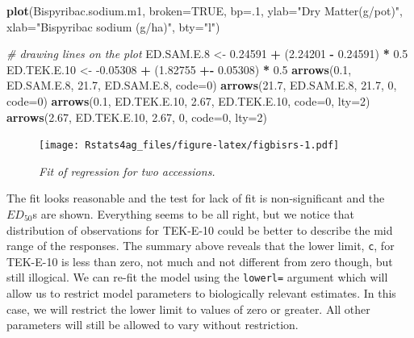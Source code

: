 \documentclass[letterpaper,]{book}
\newenvironment{Shaded}{\begin{snugshade}}{\end{snugshade}}
\newcommand{\CommentTok}[1]{\textcolor[rgb]{0.56,0.35,0.01}{\textit{#1}}}
\newcommand{\DataTypeTok}[1]{\textcolor[rgb]{0.13,0.29,0.53}{#1}}
\newcommand{\DecValTok}[1]{\textcolor[rgb]{0.00,0.00,0.81}{#1}}
\newcommand{\FloatTok}[1]{\textcolor[rgb]{0.00,0.00,0.81}{#1}}
\newcommand{\KeywordTok}[1]{\textcolor[rgb]{0.13,0.29,0.53}{\textbf{#1}}}
\newcommand{\NormalTok}[1]{#1}
\newcommand{\OperatorTok}[1]{\textcolor[rgb]{0.81,0.36,0.00}{\textbf{#1}}}
\newcommand{\OtherTok}[1]{\textcolor[rgb]{0.56,0.35,0.01}{#1}}
\newcommand{\StringTok}[1]{\textcolor[rgb]{0.31,0.60,0.02}{#1}}
\begin{document}
\begin{Shaded}
\begin{Highlighting}[]
\KeywordTok{plot}\NormalTok{(Bispyribac.sodium.m1, }\DataTypeTok{broken=}\OtherTok{TRUE}\NormalTok{, }\DataTypeTok{bp=}\NormalTok{.}\DecValTok{1}\NormalTok{, }\DataTypeTok{ylab=}\StringTok{"Dry Matter(g/pot)"}\NormalTok{,}
     \DataTypeTok{xlab=}\StringTok{"Bispyribac sodium (g/ha)"}\NormalTok{, }\DataTypeTok{bty=}\StringTok{"l"}\NormalTok{)}

\CommentTok{# drawing lines on the plot}
\NormalTok{ED.SAM.E}\FloatTok{.8}\NormalTok{ <-}\StringTok{ }\FloatTok{0.24591} \OperatorTok{+}\StringTok{ }\NormalTok{(}\FloatTok{2.24201} \OperatorTok{-}\StringTok{ }\FloatTok{0.24591}\NormalTok{) }\OperatorTok{*}\StringTok{ }\FloatTok{0.5}
\NormalTok{ED.TEK.E}\FloatTok{.10}\NormalTok{ <-}\StringTok{ }\FloatTok{-0.05308} \OperatorTok{+}\StringTok{ }\NormalTok{(}\FloatTok{1.82755} \OperatorTok{+-}\StringTok{ }\FloatTok{0.05308}\NormalTok{) }\OperatorTok{*}\StringTok{ }\FloatTok{0.5}
\KeywordTok{arrows}\NormalTok{(}\FloatTok{0.1}\NormalTok{, ED.SAM.E}\FloatTok{.8}\NormalTok{, }\FloatTok{21.7}\NormalTok{, ED.SAM.E}\FloatTok{.8}\NormalTok{, }\DataTypeTok{code=}\DecValTok{0}\NormalTok{)}
\KeywordTok{arrows}\NormalTok{(}\FloatTok{21.7}\NormalTok{, ED.SAM.E}\FloatTok{.8}\NormalTok{, }\FloatTok{21.7}\NormalTok{, }\DecValTok{0}\NormalTok{, }\DataTypeTok{code=}\DecValTok{0}\NormalTok{)}
\KeywordTok{arrows}\NormalTok{(}\FloatTok{0.1}\NormalTok{, ED.TEK.E}\FloatTok{.10}\NormalTok{, }\FloatTok{2.67}\NormalTok{, ED.TEK.E}\FloatTok{.10}\NormalTok{, }\DataTypeTok{code=}\DecValTok{0}\NormalTok{, }\DataTypeTok{lty=}\DecValTok{2}\NormalTok{)}
\KeywordTok{arrows}\NormalTok{(}\FloatTok{2.67}\NormalTok{, ED.TEK.E}\FloatTok{.10}\NormalTok{, }\FloatTok{2.67}\NormalTok{, }\DecValTok{0}\NormalTok{, }\DataTypeTok{code=}\DecValTok{0}\NormalTok{, }\DataTypeTok{lty=}\DecValTok{2}\NormalTok{)}
\end{Highlighting}
\end{Shaded}

\begin{figure}
\centering
\texttt{[image: Rstats4ag\_files/figure-latex/figbisrs-1.pdf]}
\caption{\label{fig:figbisrs}\emph{Fit of regression for two accessions.}}
\end{figure}

The fit looks reasonable and the test for lack of fit is non-significant and the \(ED_{50}\)s are shown. Everything seems to be all right, but we notice that distribution of observations for TEK-E-10 could be better to describe the mid range of the responses. The summary above reveals that the lower limit, \texttt{c}, for TEK-E-10 is less than zero, not much and not different from zero though, but still illogical. We can re-fit the model using the \texttt{lowerl=} argument which will allow us to restrict model parameters to biologically relevant estimates. In this case, we will restrict the lower limit to values of zero or greater. All other parameters will still be allowed to vary without restriction.
\end{document}
